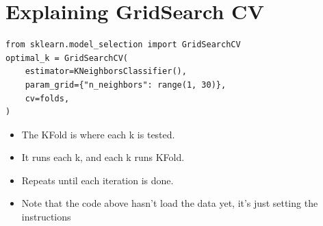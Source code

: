 \documentclass{article}        %
\begin{document}
\section {Explaining GridSearch CV}
\begin{verbatim}
from sklearn.model_selection import GridSearchCV
optimal_k = GridSearchCV(
    estimator=KNeighborsClassifier(),
    param_grid={"n_neighbors": range(1, 30)},
    cv=folds,
)
\end{verbatim}

\begin{itemize}
    \item The KFold is where each k is tested. 
    \item It runs each k, and each k runs KFold.
    \item Repeats until each iteration is done.
    \item Note that the code above hasn't load the data yet, it's just setting the instructions
\end{itemize}
\end{document}
